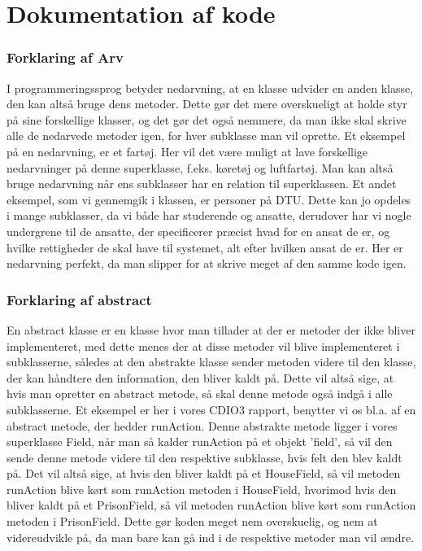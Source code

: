 \section{Dokumentation af kode}

\subsubsection{Forklaring af Arv}
I programmeringssprog betyder nedarvning, at en klasse udvider en anden klasse, den kan altså bruge dens metoder. Dette gør det mere overskueligt at holde styr på sine forskellige klasser, og det gør det også nemmere, da man ikke skal skrive alle de nedarvede metoder igen, for hver subklasse man vil oprette. Et eksempel på en nedarvning, er et fartøj. Her vil det være muligt at lave forskellige nedarvninger på denne superklasse, f.eks. køretøj og luftfartøj. Man kan altså bruge nedarvning når ens subklasser har en relation til superklassen. Et andet eksempel, som vi gennemgik i klassen, er personer på DTU. Dette kan jo opdeles i mange subklasser, da vi både har studerende og ansatte, derudover har vi nogle undergrene til de ansatte, der specificerer præcist hvad for en ansat de er, og hvilke rettigheder de skal have til systemet, alt efter hvilken ansat de er. Her er nedarvning perfekt, da man slipper for at skrive meget af den samme kode igen.

\subsubsection{Forklaring af abstract}
En abstract klasse er en klasse hvor man tillader at der er metoder der ikke bliver implementeret, med dette menes der at disse metoder vil blive implementeret i subklasserne, således at den abstrakte klasse sender metoden videre til den klasse, der kan håndtere den information, den bliver kaldt på. Dette vil altså sige, at hvis man opretter en abstract metode, så skal denne metode også indgå i alle subklasserne. Et eksempel er her i vores CDIO3 rapport, benytter vi os bl.a. af en abstract metode, der hedder runAction. Denne abstrakte metode ligger i vores superklasse Field, når man så kalder runAction på et objekt 'field', så vil den sende denne metode videre til den respektive subklasse, hvis felt den blev kaldt på. Det vil altså sige, at hvis den bliver kaldt på et HouseField, så vil metoden runAction blive kørt som runAction metoden i HouseField, hvorimod hvis den bliver kaldt på et PrisonField, så vil metoden runAction blive kørt som runAction metoden i PrisonField. Dette gør koden meget nem overskuelig, og nem at videreudvikle på, da man bare kan gå ind i de respektive metoder man vil ændre.

